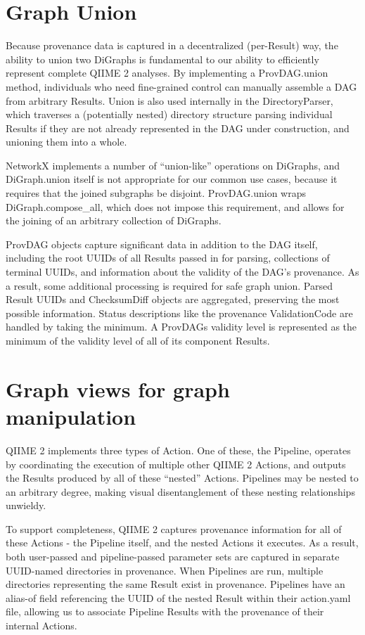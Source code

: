 \section{Graph Union}

Because provenance data is captured in a decentralized (per-Result) way, the
ability to union two DiGraphs is fundamental to our ability to efficiently
represent complete QIIME 2 analyses. By implementing a ProvDAG.union method,
individuals who need fine-grained control can manually assemble a DAG from
arbitrary Results. Union is also used internally in the DirectoryParser, which
traverses a (potentially nested) directory structure parsing individual Results
if they are not already represented in the DAG under construction, and unioning
them into a whole.

NetworkX implements a number of “union-like” operations on DiGraphs, and
DiGraph.union itself is not appropriate for our common use cases, because it
requires that the joined subgraphs be disjoint. ProvDAG.union wraps
DiGraph.compose\_all, which does not impose this requirement, and allows for the
joining of an arbitrary collection of DiGraphs.

ProvDAG objects capture significant data in addition to the DAG itself,
including the root UUIDs of all Results passed in for parsing, collections of
terminal UUIDs, and information about the validity of the DAG’s provenance. As a
result, some additional processing is required for safe graph union. Parsed
Result UUIDs and ChecksumDiff objects are aggregated, preserving the most
possible information. Status descriptions like the provenance ValidationCode are
handled by taking the minimum. A ProvDAGs validity level is represented as the
minimum of the validity level of all of its component Results.


\section{Graph views for graph manipulation}

QIIME 2 implements three types of Action. One of these, the Pipeline, operates
by coordinating the execution of multiple other QIIME 2 Actions, and outputs the
Results produced by all of these “nested” Actions. Pipelines may be nested to an
arbitrary degree, making visual disentanglement of these nesting relationships
unwieldy.

To support completeness, QIIME 2 captures provenance information for all of
these Actions - the Pipeline itself, and the nested Actions it executes. As a
result, both user-passed and pipeline-passed parameter sets are captured in
separate UUID-named directories in provenance. When Pipelines are run, multiple
directories representing the same Result exist in provenance. Pipelines have an
alias-of field referencing the UUID of the nested Result within their
action.yaml file, allowing us to associate Pipeline Results with the provenance
of their internal Actions. 


